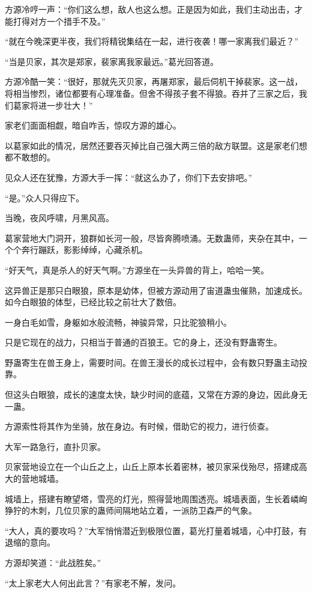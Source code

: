 \begin{this_body}
方源冷哼一声：“你们这么想，敌人也这么想。正是因为如此，我们主动出击，才能打得对方一个措手不及。”

“就在今晚深更半夜，我们将精锐集结在一起，进行夜袭！哪一家离我们最近？”

“当是贝家，其次是郑家，裴家离我家最远。”葛光回答道。

方源冷酷一笑：“很好，那就先灭贝家，再屠郑家，最后伺机干掉裴家。这一战，将相当惨烈，诸位都要有心理准备。但舍不得孩子套不得狼。吞并了三家之后，我们葛家将进一步壮大！”

家老们面面相觑，暗自咋舌，惊叹方源的雄心。

以葛家如此的情况，居然还要吞灭掉比自己强大两三倍的敌方联盟。这是家老们想都不敢想的。

见众人还在犹豫，方源大手一挥：“就这么办了，你们下去安排吧。”

“是。”众人只得应下。

当晚，夜风呼啸，月黑风高。

葛家营地大门洞开，狼群如长河一般，尽皆奔腾喷涌。无数蛊师，夹杂在其中，一个个奔行蹦跃，影影绰绰，心藏杀机。

“好天气，真是杀人的好天气啊。”方源坐在一头异兽的背上，哈哈一笑。

这异兽正是那只白眼狼，原本是幼体，但被方源动用了宙道蛊虫催熟，加速成长。如今白眼狼的体型，已经比较之前壮大了数倍。

一身白毛如雪，身躯如水般流畅，神骏异常，只比驼狼稍小。

只是它现在的战力，只相当于普通的百狼王。它的身上，还没有野蛊寄生。

野蛊寄生在兽王身上，需要时间。在兽王漫长的成长过程中，会有数只野蛊主动投靠。

但这头白眼狼，成长的速度太快，缺少时间的底蕴，又常在方源的身边，因此身无一蛊。

方源索性将其作为坐骑，放在身边。有时候，借助它的视力，进行侦查。

大军一路急行，直扑贝家。

贝家营地设立在一个山丘之上，山丘上原本长着密林，被贝家采伐殆尽，搭建成高大的营地城墙。

城墙上，搭建有瞭望塔，雪亮的灯光，照得营地周围透亮。城墙表面，生长着嶙峋狰狞的木刺，几位贝家的蛊师间隔地站立着，一派防卫森严的气象。

“大人，真的要攻吗？”大军悄悄潜近到极限位置，葛光打量着城墙，心中打鼓，有退缩的意向。

方源却笑道：“此战胜矣。”

“太上家老大人何出此言？”有家老不解，发问。


\end{this_body}
